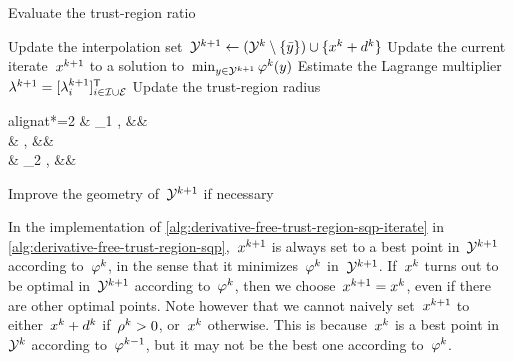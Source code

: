 \begin{algorithm}
{        Evaluate the trust-region ratio
        \begin{algomathdisplay}
            \ratio[k] \gets {}
        \end{algomathdisplay}
        Update the interpolation set~$\xpt[k + 1] \gets (\xpt[k] \setminus \set{\bar{y}}) \cup \set{\iter[k] + \step[k]}$\;
        Update the current iterate~$\iter[k + 1]$ to a solution to~$\min_{y \in \xpt[k + 1]} \merit[k](y)$\; 
        Estimate the Lagrange multiplier~$\lm[k + 1] = [\lm[k + 1]_i]_{i \in \iub \cup \ieq}^{\T}$\; 
        Update the trust-region radius
        \begin{algoempheq}[left={\rad[k + 1] \gets \empheqlbrace}]{alignat*=2}
            & \theta_1 \rad[k],  && \quad {}\\
            & \rad[k],           && \quad {}\\
            & \theta_2 \rad[k],  && \quad {}
        \end{algoempheq} \label{alg:derivative-free-trust-region-sqp-radius}
        Improve the geometry of~$\xpt[k + 1]$ if necessary\; \label{alg:derivative-free-trust-region-sqp-geometry}
    }
\end{algorithm}

In the implementation of \cref{alg:derivative-free-trust-region-sqp-iterate} in \cref{alg:derivative-free-trust-region-sqp},~$\iter[k + 1]$ is always set to a best point in~$\xpt[k + 1]$ according to~$\merit[k]$, in the sense that it minimizes~$\merit[k]$ in~$\xpt[k + 1]$.
If~$\iter[k]$ turns out to be optimal in~$\xpt[k + 1]$ according to~$\merit[k]$, then we choose~$\iter[k + 1] = \iter[k]$, even if there are other optimal points.
Note however that we cannot naively set~$\iter[k + 1]$ to either~$\iter[k] + \step[k]$ if~$\ratio[k] > 0$, or~$\iter[k]$ otherwise.
This is because~$\iter[k]$ is a best point in~$\xpt[k]$ according to~$\merit[k - 1]$, but it may not be the best one according to~$\merit[k]$.

